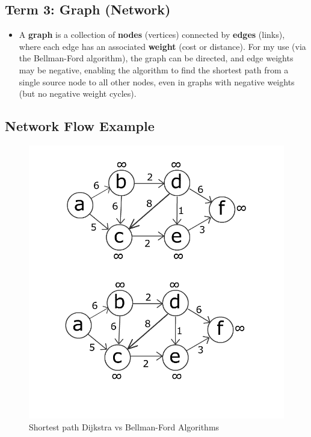 \documentclass[
  letterpaper,
  DIV=11,
  numbers=noendperiod]{scrartcl}
\providecommand{\tightlist}{%
  \setlength{\itemsep}{0pt}\setlength{\parskip}{0pt}}\usepackage{longtable,booktabs,array}
\begin{document}
\subsection{Term 3: Graph (Network)}\label{term-3-graph-network}

\begin{itemize}
\tightlist
\item
  A \textbf{graph} is a collection of \textbf{nodes} (vertices)
  connected by \textbf{edges} (links), where each edge has an associated
  \textbf{weight} (cost or distance). For my use (via the Bellman-Ford
  algorithm), the graph can be directed, and edge weights may be
  negative, enabling the algorithm to find the shortest path from a
  single source node to all other nodes, even in graphs with negative
  weights (but no negative weight cycles).
\end{itemize}

\subsection{Network Flow Example}\label{network-flow-example}

\begin{figure}[H]

{\centering \includegraphics[width=8.25in,height=\textheight]{images/Shortest_path_Dijkstra_vs_BellmanFord.gif}

}

\caption{Shortest path Dijkstra vs Bellman-Ford Algorithms}

\end{figure}%
\end{document}
